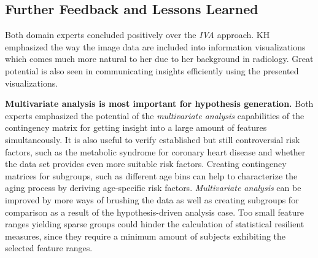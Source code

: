 \documentclass[journal]{style/vgtc} 			          %
\newcommand{\com}[1]{\textcolor{orange}{\uline{#1}}}
\begin{document}

\subsection{Further Feedback and Lessons Learned} \label{Lessons Learned}
%
Both domain experts concluded positively over the \emph{IVA} approach. %
%
KH emphasized the way the image data are included into information visualizations which comes much more natural to her due to her background in radiology.
%
%
Great potential is also seen in communicating insights efficiently using the presented visualizations.

\textbf{Multivariate analysis is most important for hypothesis generation.}
Both experts emphasized the potential of the \emph{multivariate analysis} capabilities of the contingency matrix for getting insight into a large amount of features simultaneously.
%
It is also useful to verify established but still controversial risk factors, such as the metabolic syndrome for coronary heart disease and whether the data set provides even more suitable risk factors.
%
Creating contingency matrices for subgroups, such as different age bins can help to characterize the aging process by deriving age-specific risk factors.
%
\emph{Multivariate analysis} can be improved by more ways of brushing the data as well as creating subgroups for comparison as a result of the hypothesis-driven analysis case.
%
Too small feature ranges yielding sparse groups could hinder the calculation of statistical resilient measures, since they require a minimum amount of subjects exhibiting the selected feature ranges.
%
\end{document}
